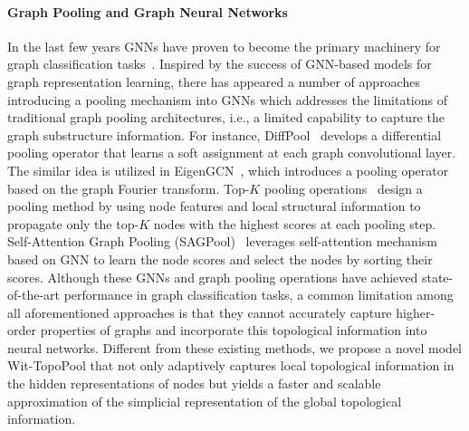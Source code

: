 \documentclass[letterpaper]{article} %
\begin{document}
\paragraph{Graph Pooling and Graph Neural Networks}
In the last few years GNNs have proven to become the primary machinery for graph classification tasks~\cite{zhou2020graph, xia2021graph}.
Inspired by the success of GNN-based models for graph representation learning, there has appeared a number of approaches introducing a pooling mechanism into GNNs which addresses the limitations of traditional graph pooling architectures, i.e., a limited capability to capture the graph substructure information. For instance, DiffPool~\cite{ying2018hierarchical} develops a differential pooling operator that learns a soft assignment at each graph convolutional layer. The similar idea is utilized in EigenGCN~\cite{ma2019graph}, which introduces a pooling operator based on the graph Fourier transform. Top-$K$ pooling operations~\cite{cangea2018towards,gao2019graph} design a pooling method by using node features and local structural information to propagate only the top-$K$ nodes with the highest scores at each pooling step. Self-Attention Graph Pooling (SAGPool)~\cite{lee2019self} leverages self-attention mechanism based on GNN to learn the node scores and select the nodes by sorting their scores. Although these GNNs and graph pooling operations have achieved state-of-the-art performance in graph classification tasks, a common limitation among all aforementioned approaches is that they cannot accurately capture higher-order properties of graphs and incorporate this topological information into neural networks. Different from these existing methods, we propose a novel model Wit-TopoPool that not only adaptively captures local topological information in the hidden representations of nodes but yields a faster and scalable approximation of the simplicial representation of the global topological information.
\end{document}
